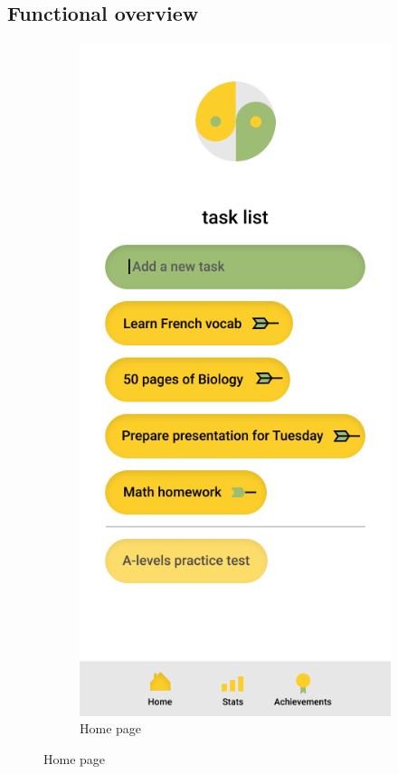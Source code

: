 \subsection{Functional overview}
\begin{figure}[htb!]
    \begin{center}
        \begin{subfigure}{.3\textwidth}
            \centering
            \includegraphics[width=0.8\linewidth]{images/sage_home.png}
            \caption{Home page}
            \label{fig:gmaps_gamify_home}

\end{subfigure}
\end{center}
\end{figure}
